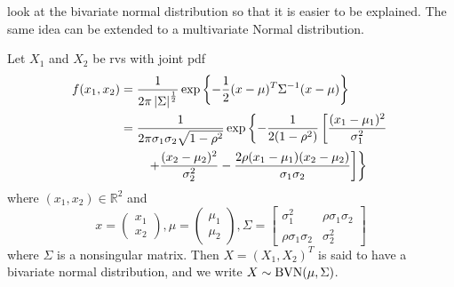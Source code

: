 \documentclass[notoc,notitlepage]{tufte-book}
\begin{document}
 look at the bivariate normal distribution so that it is easier to be explained. The same idea can be extended to a multivariate Normal distribution.

\begin{defn}
\label{defn:bivariate_normal_distribution}
    Let $X_1$ and $X_2$ be rvs with joint pdf
    \begin{align*}
      f(x_1, x_2)
        &= \frac{1}{2 \pi \left|\Sigma\right|^{\frac{1}{2}}} \exp \left\{ - \frac{1}{2} ( x - \mu )^T \Sigma^{-1} (x - \mu) \right\} \\
        &= \frac{1}{2 \pi \sigma_1 \sigma_2 \sqrt{ 1 - \rho^2 }} \exp \left\{ - \frac{1}{2( 1 - \rho^2 )} \left[ \frac{(x_1 - \mu_1)^2}{\sigma_1^2} \right. \right. \\
        &\qquad \left. \left. + \frac{(x_2 - \mu_2)^2}{\sigma_2^2} - \frac{2 \rho (x_1 - \mu_1)(x_2 - \mu_2)}{\sigma_1 \sigma_2} \right] \right\}
    \end{align*}
    where $(x_1, x_2) \in \mathbb{R}^2$ and
    \begin{equation*}
      x = \begin{pmatrix} x_1 \\ x_2 \end{pmatrix}, \mu = \begin{pmatrix} \mu_1 \\ \mu_2 \end{pmatrix}, \Sigma = \begin{bmatrix}
        \sigma_1^2 & \rho \sigma_1 \sigma_2 \\
        \rho \sigma_1 \sigma_2 & \sigma_2^2
      \end{bmatrix}
    \end{equation*}
    where $\Sigma$ is a nonsingular matrix. Then $X = (X_1, X_2)^T$ is said to have a bivariate normal distribution, and we write $X \sim \operatorname{BVN}(\mu, \Sigma)$.
\end{defn}
\end{document}
